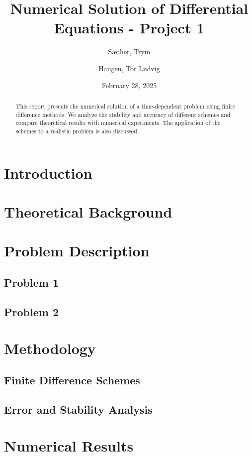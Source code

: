 \documentclass[a4paper,12pt]{article}
\title{Numerical Solution of Differential Equations - Project 1}
\author[1]{Sæther, Trym}
\author[2]{Haugen, Tor Ludvig}
\affil[1]{Department of Mathematical Sciences, NTNU}
\date{February 28, 2025}
\begin{document}
\maketitle

\begin{abstract}
This report presents the numerical solution of a time-dependent problem using finite difference methods. We analyze the stability and accuracy of different schemes and compare theoretical results with numerical experiments. The application of the schemes to a realistic problem is also discussed.
\end{abstract}

\section{Introduction}
\lipsum[1]

\section{Theoretical Background}
\lipsum[2]

\section{Problem Description}
\subsection{Problem 1}
\lipsum[3]

\subsection{Problem 2}
\lipsum[4]

\section{Methodology}
\subsection{Finite Difference Schemes}
\lipsum[5]

\subsection{Error and Stability Analysis}
\lipsum[6]

\section{Numerical Results}
\end{document}
